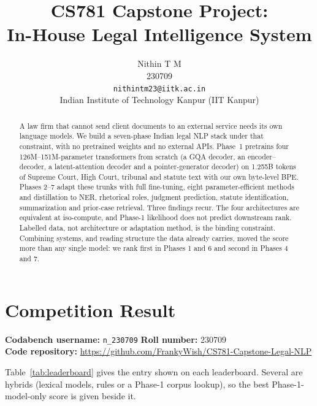 \documentclass[11pt, oneside]{article}
\title{CS781 Capstone Project:\\
In-House Legal Intelligence System}
\author{
    Nithin T M  \\
    230709 \\
    {\tt nithintm23@iitk.ac.in}\\
    Indian Institute of Technology Kanpur (IIT Kanpur)
}
\date{}
\begin{document}
\maketitle
\begin{abstract}
A law firm that cannot send client documents to an external service needs its own
language models. We build a seven-phase Indian legal NLP stack under that constraint, with
no pretrained weights and no external APIs. Phase~1 pretrains four 126M--151M-parameter
transformers from scratch (a GQA decoder, an encoder--decoder, a latent-attention decoder and
a pointer-generator decoder) on 1.255B tokens of Supreme Court, High Court, tribunal and
statute text with our own byte-level BPE. Phases 2--7 adapt these trunks with full
fine-tuning, eight parameter-efficient methods and distillation to NER, rhetorical roles,
judgment prediction, statute identification, summarization and prior-case retrieval. Three
findings recur. The four architectures are equivalent at iso-compute, and Phase-1 likelihood
does not predict downstream rank. Labelled data, not architecture or adaptation method, is
the binding constraint. Combining systems, and reading structure the data already carries,
moved the score more than any single model: we rank first in Phases 1 and 6 and second in Phases 4 and 7.
\end{abstract}

\section{Competition Result}
\noindent
\textbf{Codabench username:} \texttt{n\_230709}
\hfill
\textbf{Roll number:} 230709\\
\textbf{Code repository:} \url{https://github.com/FrankyWish/CS781-Capstone-Legal-NLP}
\medskip

\noindent
Table~\ref{tab:leaderboard} gives the entry shown on each leaderboard. Several are hybrids (lexical
models, rules or a Phase-1 corpus lookup), so the best Phase-1-model-only score is given beside it.
\end{document}
